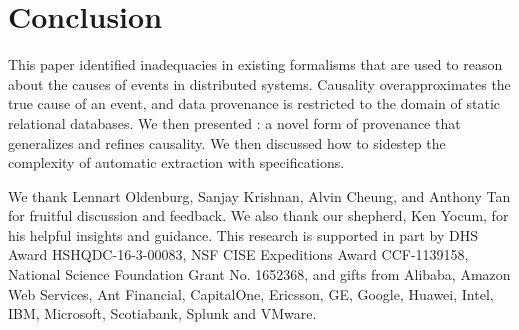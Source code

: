 \section{Conclusion}
This paper identified inadequacies in existing formalisms that are used to
reason about the causes of events in distributed systems. Causality
overapproximates the true cause of an event, and data provenance is restricted
to the domain of static relational databases.  We then presented
\watprovenance{}: a novel form of provenance that generalizes \whyprovenance{}
and refines causality. We then discussed how to sidestep the complexity of
automatic \watprovenance{} extraction with \watprovenance{} specifications.

\begin{acks}
  We thank Lennart Oldenburg, Sanjay Krishnan, Alvin Cheung, and Anthony Tan
  for fruitful discussion and feedback. We also thank our shepherd, Ken Yocum,
  for his helpful insights and guidance.
  This research is supported in part by DHS Award HSHQDC-16-3-00083, NSF CISE
  Expeditions Award CCF-1139158, National Science Foundation Grant No. 1652368,
  and gifts from Alibaba, Amazon Web Services, Ant Financial, CapitalOne,
  Ericsson, GE, Google, Huawei, Intel, IBM, Microsoft, Scotiabank, Splunk and
  VMware.
\end{acks}
